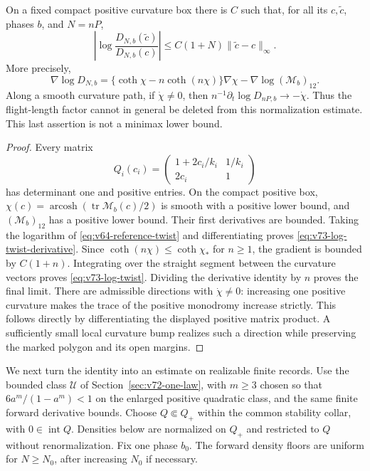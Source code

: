 \begin{lemma}\label{lem:v73-log-twist}
On a fixed compact positive curvature box there is $C$ such that, for
all its $c,\widetilde c$, phases $b$, and $N=nP$,
\begin{equation}\label{eq:v73-log-twist}
 \left|\log\frac{D_{N,b}(\widetilde c)}{D_{N,b}(c)}\right|
 \le C(1+N)\|\widetilde c-c\|_\infty.
\end{equation}
More precisely,
\begin{equation}\label{eq:v73-log-twist-derivative}
 \nabla\log D_{N,b}
 =\{\coth\chi-n\coth(n\chi)\}\nabla\chi
               -\nabla\log(\mathcal M_b)_{12}.
\end{equation}
Along a smooth curvature path, if $\dot\chi\ne0$, then
$n^{-1}\partial_t\log D_{nP,b}\to-\dot\chi$.  Thus the flight-length
factor cannot in general be deleted from this normalization estimate.
This last assertion is not a minimax lower bound.
\end{lemma}
\begin{proof}
Every matrix
\[
 Q_i(c_i)=
 \begin{pmatrix}1+2c_i/k_i&1/k_i\\2c_i&1\end{pmatrix}
\]
has determinant one and positive entries.  On the compact positive box,
$\chi(c)=\operatorname{arcosh}(\operatorname{tr}\mathcal M_b(c)/2)$
is smooth with a positive lower bound, and $(\mathcal M_b)_{12}$ has
a positive lower bound.  Their first derivatives are bounded.
Taking the logarithm of \eqref{eq:v64-reference-twist} and
differentiating proves \eqref{eq:v73-log-twist-derivative}.
Since $\coth(n\chi)\le\coth\chi_*$ for $n\ge1$, the gradient is
bounded by $C(1+n)$.  Integrating over the straight segment between the
curvature vectors proves \eqref{eq:v73-log-twist}.  Dividing the
derivative identity by $n$ proves the final limit.
There are admissible directions with $\dot\chi\ne0$: increasing one
positive curvature makes the trace of the positive monodromy increase
strictly.  This follows directly by differentiating the displayed
positive matrix product.  A sufficiently small local curvature bump
realizes such a direction while preserving the marked polygon and
its open margins.
\end{proof}

We next turn the identity into an estimate on realizable finite records.
Use the bounded class $\mathscr U$ of Section~\ref{sec:v72-one-law},
with $m\ge3$ chosen so that $6a^m/(1-a^m)<1$ on the enlarged positive
quadratic class, and the same finite forward derivative bounds.  Choose
$Q\Subset Q_+$ within the common stability collar, with $0\in\operatorname{int}Q$.
Densities below are normalized on $Q_+$ and restricted to $Q$ without
renormalization.  Fix one phase $b_0$.  The forward density floors are
uniform for $N\ge N_0$, after increasing $N_0$ if necessary.

